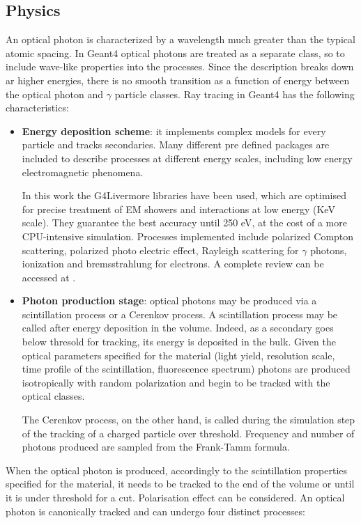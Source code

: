 \subsection{Physics}
An optical photon is characterized by a wavelength much greater than the typical atomic spacing.
In Geant4 optical photons are treated as a separate class, so to include wave-like properties into the processes.
Since the description breaks down ar higher energies, there is no smooth transition as a function of energy between the optical photon and $\gamma$ particle classes.
Ray tracing in Geant4 has the following characteristics:
\begin{itemize}
\item \textbf{Energy deposition scheme}: it implements complex models for every particle and tracks secondaries. Many different pre defined packages are included to describe processes at different energy scales, including low energy electromagnetic phenomena. 

In this work the G4Livermore libraries have been used, which are optimised for precise treatment of EM showers and interactions at low energy (KeV scale). They guarantee the best accuracy until 250 eV, at the cost of a more CPU-intensive simulation. Processes implemented include polarized Compton scattering, polarized photo electric effect, Rayleigh scattering for $\gamma$ photons, ionization and bremsstrahlung for electrons. A complete review can be accessed at \cite{Sempau2002}.

\item \textbf{Photon production stage}: optical photons may be produced via a scintillation process or a Cerenkov process. 
A scintillation process may be called after energy deposition in the volume. Indeed, as a secondary goes below thresold for tracking, its energy is deposited in the bulk. Given the optical parameters specified for the material (light yield, resolution scale, time profile of the scintillation, fluorescence spectrum) photons are produced isotropically with random polarization and begin to be tracked with the optical classes.

The Cerenkov process, on the other hand, is called during the simulation step of the tracking of a charged particle over threshold. Frequency and number of photons produced are sampled from the Frank-Tamm formula.
\end{itemize}
When the optical photon is produced, accordingly to the scintillation properties specified for the material, it needs to be tracked to the end of the volume or until it is under threshold for a cut. Polarisation effect can be considered. An optical photon is canonically tracked and can undergo four distinct processes:
